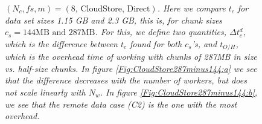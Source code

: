 \documentclass{rspublic}
\begin{document}
\begin{figure}
\begin{center}
\caption{\textit{$(N_c, fs, m) = (\mbox{8, CloudStore, Direct})$. Here we compare $t_c$ for data set sizes 1.15 GB and 2.3 GB, this is, for chunk sizes $c_s = 144\mbox{MB and } 287\mbox{MB}$. For this, we define two quantities, $\Delta t_c^d$, which is the difference between $t_c$ found for both $c_s$'s, and $t_{O/H}$, which is the overhead time of working with chunks of 287MB in size vs. half-size chunks. In figure \ref{Fig:CloudStore287minus144:a} we see that the difference decreases with the number of workers, but does not scale linearly with $N_w$. In figure \ref{Fig:CloudStore287minus144:b}, we see that the remote data case (C2) is the one with the most overhead.}}
\label{Fig:CloudStore287minus144}
\end{center}
\end{figure}
\end{document}

